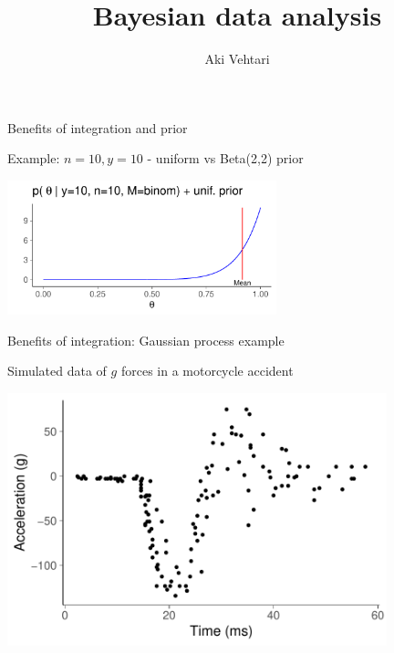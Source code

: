 \documentclass[english,t]{beamer}
\title[]{Bayesian data analysis}
\subtitle{}
\author{Aki Vehtari}
\institute[  Aalto]{}
\begin{document}
 

\begin{frame}{Benefits of integration and prior}

  \vspace{-0.5\baselineskip}
  Example: $n=10, y=10$ - uniform vs Beta(2,2) prior
  \begin{center}
  \includegraphics[width=7.8cm]{dbbeta10a.pdf}\\
  \end{center}

\end{frame}

\begin{frame}{Benefits of integration: Gaussian process example}

  Simulated data of $g$ forces in a motorcycle accident

  \includegraphics[width=11cm]{motorcycle_data.pdf}
  
\end{frame}
\end{document}
